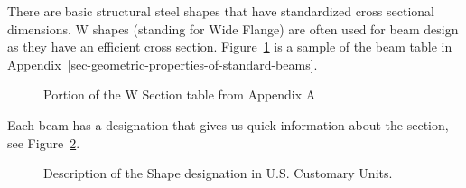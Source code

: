 \documentclass[
  letterpaper,
  DIV=11,
  numbers=noendperiod]{scrreprt}
\theoremstyle{definition}
\theoremstyle{remark}
\begin{document}
There are basic structural steel shapes that have standardized cross
sectional dimensions. W shapes (standing for Wide Flange) are often used
for beam design as they have an efficient cross section.
Figure~\ref{fig-9.10} is a sample of the beam table in
Appendix~\ref{sec-geometric-properties-of-standard-beams}.

\begin{figure}


\caption{\label{fig-9.10}Portion of the W Section table from Appendix A}

\end{figure}%

Each beam has a designation that gives us quick information about the
section, see Figure~\ref{fig-9.11}.

\begin{figure}


\caption{\label{fig-9.11}Description of the Shape designation in U.S.
Customary Units.}

\end{figure}%
\end{document}
